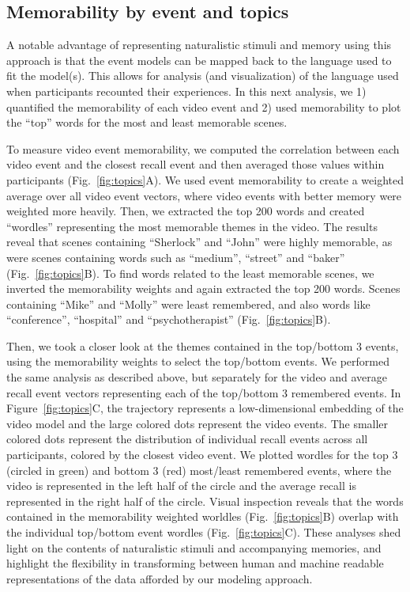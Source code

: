 \documentclass{article}
\begin{document}
\subsection*{Memorability by event and topics}
A notable advantage of representing naturalistic stimuli and memory using this approach is that the event models can be mapped back to the language used to fit the model(s).  This allows for analysis (and visualization) of the language used when participants recounted their experiences.  In this next analysis, we 1) quantified the memorability of each video event and 2) used memorability to plot the ``top'' words for the most and least memorable scenes.

To measure video event memorability, we computed the correlation between each video event and the closest recall event and then averaged those values within participants (Fig.~\ref{fig:topics}A). We used event memorability to create a weighted average over all video event vectors, where video events with better memory were weighted more heavily. Then, we extracted the top 200 words and created ``wordles'' representing the most memorable themes in the video. The results reveal that scenes containing ``Sherlock'' and ``John'' were highly memorable, as were scenes containing words such as ``medium'', ``street'' and ``baker'' (Fig.~\ref{fig:topics}B). To find words related to the least memorable scenes, we inverted the memorability weights and again extracted the top 200 words.  Scenes containing ``Mike'' and ``Molly'' were least remembered, and also words like ``conference'', ``hospital'' and ``psychotherapist'' (Fig.~\ref{fig:topics}B).

Then, we took a closer look at the themes contained in the top/bottom 3 events, using the memorability weights to select the top/bottom events. We performed the same analysis as described above, but separately for the video and average recall event vectors representing each of the top/bottom 3 remembered events. In Figure~\ref{fig:topics}C, the trajectory represents a low-dimensional embedding of the video model and the large colored dots represent the video events. The smaller colored dots represent the distribution of individual recall events across all participants, colored by the closest video event. We plotted wordles for the top 3 (circled in green) and bottom 3 (red) most/least remembered events, where the video is represented in the left half of the circle and the average recall is represented in the right half of the circle. Visual inspection reveals that the words contained in the memorability weighted worldles (Fig.~\ref{fig:topics}B) overlap with the individual top/bottom event wordles (Fig.~\ref{fig:topics}C). These analyses shed light on the contents of naturalistic stimuli and accompanying memories, and highlight the flexibility in transforming between human and machine readable representations of the data afforded by our modeling approach.
\end{document}
